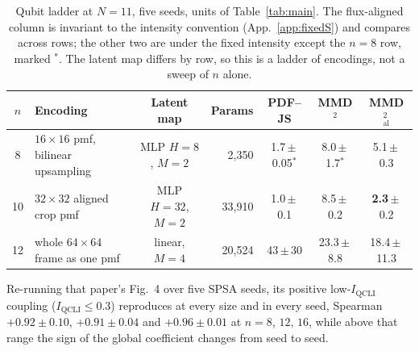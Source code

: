 \documentclass{article}
\newcommand{\qcli}{I_{\mathrm{QCLI}}}
\begin{document}
\begin{table}[!ht]
\centering
\caption{Qubit ladder at $N{=}11$, five seeds, units of Table~\ref{tab:main}. The flux-aligned column
is invariant to the intensity convention (App.~\ref{app:fixedS}) and compares across rows; the other
two are under the fixed intensity except the $n=8$ row, marked $^{*}$. The latent map differs by row,
so this is a ladder of encodings, not a sweep of $n$ alone.}
\label{tab:nsweep}
\scriptsize
\setlength{\tabcolsep}{4pt}
\begin{tabular}{clcrccc}
\toprule
$n$ & Encoding & Latent map & Params & PDF--JS & MMD$^2$ & MMD$^2_{\mathrm{al}}$ \\
\midrule
8  & $16\times16$ pmf, bilinear upsampling & MLP $H{=}8$, $M{=}2$  & 2{,}350  & 1.7\,$\pm$\,0.05$^{*}$ & 8.0\,$\pm$\,1.7$^{*}$ & 5.1\,$\pm$\,0.3 \\
10 & $32\times32$ aligned crop pmf         & MLP $H{=}32$, $M{=}2$ & 33{,}910 & 1.0\,$\pm$\,0.1 & 8.5\,$\pm$\,0.2 & \textbf{2.3}\,$\pm$\,0.2 \\
12 & whole $64\times64$ frame as one pmf   & linear, $M{=}4$       & 20{,}524 & 43\,$\pm$\,30 & 23.3\,$\pm$\,8.8 & 18.4\,$\pm$\,11.3 \\
\bottomrule
\end{tabular}
\end{table}

Re-running that paper's Fig.~4 over five SPSA seeds, its positive low-$\qcli$ coupling
($\qcli \le 0.3$) reproduces at every size and in every seed, Spearman $+0.92 \pm 0.10$,
$+0.91 \pm 0.04$ and $+0.96 \pm 0.01$ at $n = 8$, $12$, $16$, while above that range the sign of the
global coefficient changes from seed to seed.

\label{app:diffs}
\end{document}
